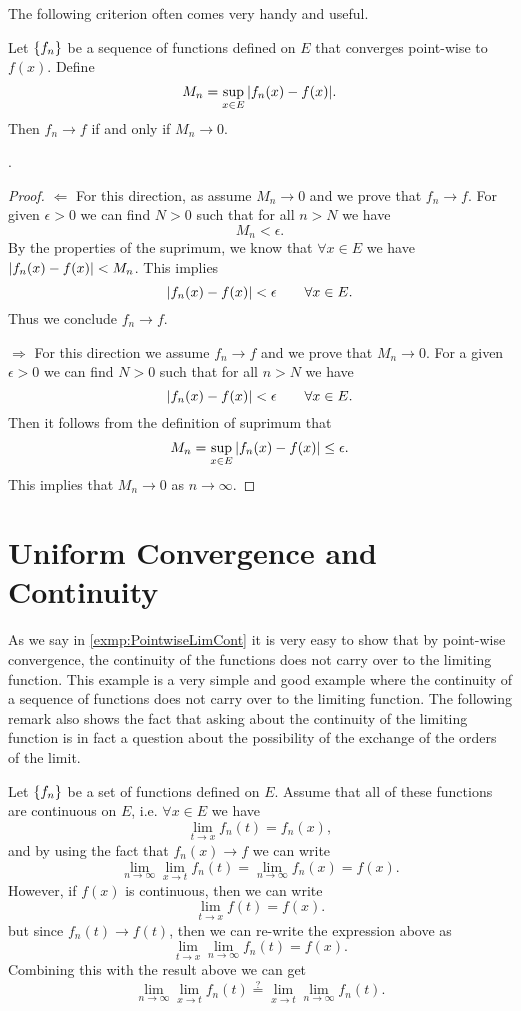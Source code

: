 The following criterion often comes very handy and useful.
\begin{proposition}
	\label{prop:uniformConvSup}
	Let $\{f_n\}$ be a sequence of functions defined on $E$ that converges point-wise to $ f(x) $. Define 
	\[ M_n = \sup_{x\in E}|f_n(x) - f(x)|. \]
	Then $f_n \to f$ if and only if $M_n \to 0$.
\end{proposition}.
\begin{proof}
	\noindent $\boxed{\Longleftarrow}$ For this direction, as assume $M_n \to 0$ and we prove that $f_n \to f$. For given $\epsilon>0$ we can find $N>0$ such that for all $n>N$ we have
	\[ M_n < \epsilon. \]
	By the properties of the suprimum, we know that $\forall x\in E$ we have $|f_n(x) - f(x)| < M_n$. This implies 
	\[ |f_n(x) - f(x)|  < \epsilon \qquad \forall x\in E.\]
	Thus we conclude $f_n \to f$.
	
	\noindent $\boxed{\Longrightarrow}$ For this direction we assume $f_n \to f$ and we prove that $M_n \to 0$. For a given $\epsilon>0$ we can find $N>0$ such that for all $n>N$ we have
	\[ |f_n(x) - f(x)| < \epsilon \qquad \forall x\in E. \]
	Then it follows from the definition of suprimum that 
	\[ M_n = \sup_{x\in E} |f_n(x) - f(x)|  \leq \epsilon. \]
	This implies that $M_n \to 0$ as $n\to \infty$.
 \end{proof}


\section{Uniform Convergence and Continuity}
As we say in \autoref{exmp:PointwiseLimCont} it is very easy to show that by point-wise convergence, the continuity of the functions does not carry over to the limiting function. This example is a very simple and good example where the continuity of a sequence of functions does not carry over to the limiting function. The following remark also shows the fact that asking about the continuity of the limiting function is in fact a question about the possibility of the exchange of the orders of the limit.

\begin{remark}
	Let $\{f_n\}$ be a set of functions defined on $E$. Assume that all of these functions are continuous on $E$, i.e. $\forall x\in E$ we have
	\[ \lim_{t\to x}f_n(t) = f_n(x), \]
	and by using the fact that $f_n(x) \to f$ we can write
	\[ \lim_{n\to \infty} \lim_{x\to t} f_n(t) = \lim_{n\to\infty}f_n(x)  = f(x). \]
	However, if $f(x)$ is continuous, then we can write
	\[ \lim_{t\to x} f(t) =f(x). \]
	but since $f_n(t) \to f(t)$, then we can re-write the expression above as
	\[ \lim_{t\to x} \lim_{n\to\infty} f_n(t)= f(x). \]
	Combining this with the result above we can get
	\[  \boxed{\lim_{n\to \infty} \lim_{x\to t} f_n(t) \stackrel{?}{=} \lim_{x\to t} \lim_{n\to \infty} f_n(t) }. \]
\end{remark}


